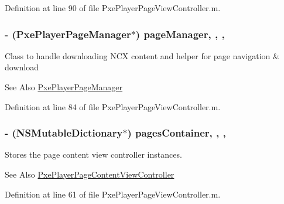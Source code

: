 Definition at line 90 of file Pxe\-Player\-Page\-View\-Controller.\-m.

\hypertarget{category_pxe_player_page_view_controller_07_08_aff618947eec45f461b189b6971198a5d}{
\subsubsection[{page\-Manager}]{\setlength{\rightskip}{0pt plus 5cm}-\/ ({\bf Pxe\-Player\-Page\-Manager}$\ast$) page\-Manager\hspace{0.3cm}{\ttfamily [read]}, {\ttfamily [write]}, {\ttfamily [nonatomic]}, {\ttfamily [strong]}}}\label{category_pxe_player_page_view_controller_07_08_aff618947eec45f461b189b6971198a5d}
Class to handle downloading N\-C\-X content and helper for page navigation \& download \begin{DoxySeeAlso}{See Also}
\hyperlink{interface_pxe_player_page_manager}{Pxe\-Player\-Page\-Manager} 
\end{DoxySeeAlso}


Definition at line 84 of file Pxe\-Player\-Page\-View\-Controller.\-m.

\hypertarget{category_pxe_player_page_view_controller_07_08_afb00dbfd0c479fe097a1fd1357826fd8}{
\subsubsection[{pages\-Container}]{\setlength{\rightskip}{0pt plus 5cm}-\/ (N\-S\-Mutable\-Dictionary$\ast$) pages\-Container\hspace{0.3cm}{\ttfamily [read]}, {\ttfamily [write]}, {\ttfamily [nonatomic]}, {\ttfamily [strong]}}}\label{category_pxe_player_page_view_controller_07_08_afb00dbfd0c479fe097a1fd1357826fd8}
Stores the page content view controller instances. \begin{DoxySeeAlso}{See Also}
\hyperlink{interface_pxe_player_page_content_view_controller}{Pxe\-Player\-Page\-Content\-View\-Controller} 
\end{DoxySeeAlso}


Definition at line 61 of file Pxe\-Player\-Page\-View\-Controller.\-m.

